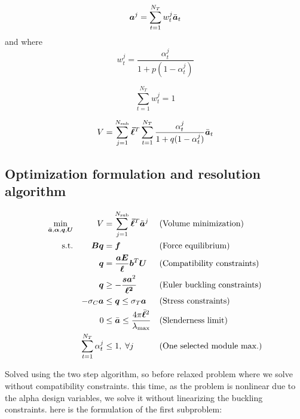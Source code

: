 \begin{equation}
    \bm{a}^j = \sum_{t=1}^{N_T} w_t^j \bar{\bm{a}}_t 
\end{equation}
and where
\begin{equation}
    w_t^j = \frac{\alpha_t^j}{1+p(1-\alpha_t^j)}    
\end{equation}

\begin{equation}
    \sum_{t=1}^{N_T} w_t^j = 1
\end{equation}

\begin{equation}
    V = \sum_{j=1}^{N_{\text{sub}}}\bm{\bar{\ell}}^T\sum_{t=1}^{N_T} \frac{\alpha_t^j}{1+q(1-\alpha_t^j)} \bar{\bm{a}}_t
\end{equation}

\subsection{Optimization formulation and resolution algorithm}
\begin{equation}
    \begin{aligned}
    \min_{\bar{\bm{a}}, \bm{\alpha}, \bm{q}, \bm{U}}   && V &= \sum_{j=1}^{N_{\text{sub}}}\bm{\bar{\ell}}^T\tilde{\bm{a}}^j && \textrm{(Volume minimization)}\\
    \textrm{s.t.}   && \bm{B}\bm{q} &= \bm{f} && \textrm{(Force equilibrium)}\\
                    && \bm{q} &= \frac{\bm{a}\bm{E}}{\bm{\ell}}\bm{b}^T\bm{U} && \textrm{(Compatibility constraints)} \\
                    && \bm{q} &\geq -\frac{\bm{s}\bm{a}^2}{\bm{\ell^2}} && \textrm{(Euler buckling constraints)} \\
                    && -\sigma_C\bm{a} &\leq \bm{q} \leq \sigma_T\bm{a} && \textrm{(Stress constraints)} \\
                    && 0 &\leq \bar{\bm{a}} \leq \frac{4 \pi \bar{\bm{\ell}}^2}{\lambda_{\text{max}}} && \textrm{(Slenderness limit)} \\
                    && \sum_{t=1}^{N_T} \alpha_t^j &\leq 1, \; \forall j && \textrm{(One selected module max.)} \\
    \end{aligned}
\end{equation}

Solved using the two step algorithm, so before relaxed problem where we solve without compatibility constraints. this time, as the problem is nonlinear due to the alpha design variables, we solve it without linearizing the buckling constraints.  here is the formulation of the first subproblem:

